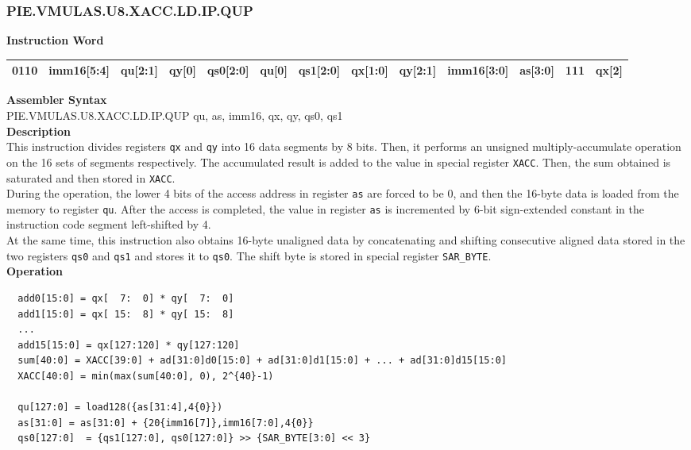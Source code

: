 \newpage
\subsubsection{PIE.VMULAS.U8.XACC.LD.IP.QUP}\label{instruction:PIEVMULASU8XACCLDIPQUP}
\setlength\tabcolsep{5pt}
\textbf{Instruction Word} \\
\begin{tabular}{|c|c|c|c|c|c|c|c|c|c|c|c|c|}
	\hline
	0110 & imm16[5:4] & qu[2:1] & qy[0] & qs0[2:0] & qu[0] & qs1[2:0] & qx[1:0] & qy[2:1] & imm16[3:0] & as[3:0] & 111 & qx[2] \\
	\hline
\end{tabular}

\textbf{Assembler Syntax} \\
PIE.VMULAS.U8.XACC.LD.IP.QUP qu, as, imm16, qx, qy, qs0, qs1 \\
\textbf{Description} \\
This instruction divides registers \lstinline{qx} and \lstinline{qy} into 16 data segments by 8 bits. Then, it performs an unsigned multiply-accumulate operation on the 16 sets of segments respectively. The accumulated result is added to the value in special register \lstinline{XACC}. Then, the sum obtained is saturated and then stored in \lstinline{XACC}.\\
During the operation, the lower 4 bits of the access address in register \lstinline{as} are forced to be 0, and then the 16-byte data is loaded from the memory to register \lstinline{qu}. After the access is completed, the value in register \lstinline{as} is incremented by 6-bit sign-extended constant in the instruction code segment left-shifted by 4.\\
At the same time, this instruction also obtains 16-byte unaligned data by concatenating and shifting consecutive aligned data stored in the two registers \lstinline{qs0} and \lstinline{qs1} and stores it to \lstinline{qs0}. The shift byte is stored in special register \lstinline{SAR_BYTE}.\\
\textbf{Operation}
\begin{lstlisting}
  add0[15:0] = qx[  7:  0] * qy[  7:  0]
  add1[15:0] = qx[ 15:  8] * qy[ 15:  8]
  ...
  add15[15:0] = qx[127:120] * qy[127:120]
  sum[40:0] = XACC[39:0] + ad[31:0]d0[15:0] + ad[31:0]d1[15:0] + ... + ad[31:0]d15[15:0]
  XACC[40:0] = min(max(sum[40:0], 0), 2^{40}-1)

  qu[127:0] = load128({as[31:4],4{0}})
  as[31:0] = as[31:0] + {20{imm16[7]},imm16[7:0],4{0}}
  qs0[127:0]  = {qs1[127:0], qs0[127:0]} >> {SAR_BYTE[3:0] << 3}
\end{lstlisting}

